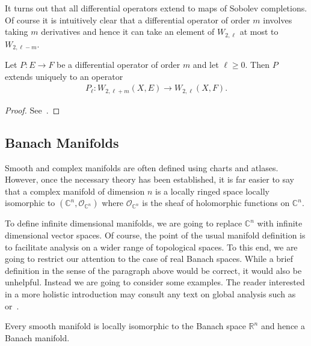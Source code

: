 \documentclass[12pt]{ociamthesis}  %
\begin{document}
It turns out that all differential operators extend to maps of Sobolev
completions. Of course it is intuitively clear that a differential
operator of order $m$ involves taking $m$ derivatives and hence
it can take an element of $W_{2,\ell}$ at most to $W_{2,\ell-m}$.

\begin{theorem}
  Let $P:E\to F$ be a differential operator of order $m$ and
  let $\ell \geq 0$. Then $P$ extends uniquely to an operator
  \begin{align}\label{eq:fredholm_extension}
    P_\ell : W_{2,\ell+m}(X,E) \to W_{2,\ell}(X,F).
  \end{align}
  \begin{proof}
    See~\cite[{Proposition 3.8.4}]{bc2009}.
  \end{proof}
\end{theorem}

\subsection{Banach Manifolds}

Smooth and complex manifolds are often defined using charts and
atlases. However, once the necessary theory has been established,
it is far easier to say that a complex manifold
of dimension $n$ is a locally ringed space locally isomorphic to
$(\mathbb{C}^n,\mathcal O_{\mathbb{C}^n})$ where
$\mathcal O_{\mathbb{C}^n}$ is the sheaf of holomorphic functions on
$\mathbb{C}^n$.

To define infinite dimensional manifolds, we are going to replace
$\mathbb{C}^n$ with infinite dimensional vector spaces. Of course,
the point of the usual manifold definition is to facilitate analysis
on a wider range of topological spaces. To this end, we are going to
restrict our attention to the case of real Banach spaces. While a brief
definition in the sense of the paragraph above would be correct,
it would also be unhelpful. Instead we are going to consider some
examples. The reader interested in a more holistic
introduction may consult any text on global analysis such
as~\cite[Chapter 7]{kahn1982} or~\cite{bc2009}.

\begin{example}
  Every smooth manifold is locally isomorphic to
  the Banach space $\mathbb R^n$ and hence a Banach manifold.
\end{example}
\end{document}
